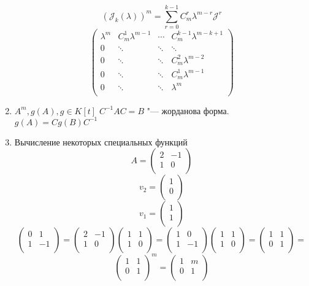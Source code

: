 \begin{enumerate}
$$(\mathcal{J}_k(\lambda))^m = \sum_{r = 0}^{k - 1}C_m^r \lambda^{m - r}\mathcal{J}^r$$
$$
\begin{pmatrix}
\lambda^m& C_m^1 \lambda^{m - 1} &\cdots& C_m^{k - 1}\lambda^{m - k + 1}\\
0&\ddots&\ddots&\ddots\\
0&\ddots&\ddots&C_m^2\lambda^{m - 2}\\
0&\ddots&\ddots&C_m^1\lambda^{m - 1}\\
0&\ddots&\ddots&\lambda^{m}\\
\end{pmatrix}
$$
\item $A^m, g(A), g \in K[t]$
$C^{-1}AC = B$ "--- жорданова форма.
$g(A) = Cg(B)C^{-1}$
\item Вычисление некоторых специальных функций
$$
A = \begin{pmatrix}
2&-1\\
1&0\\
\end{pmatrix}
$$
$$
v_2 = \begin{pmatrix}
1\\
0\\
\end{pmatrix}   
$$
$$
v_1 = \begin{pmatrix}
1\\
1\\
\end{pmatrix} 
$$
$$\begin{pmatrix}
0&1\\
1&-1\\
\end{pmatrix} = 
\begin{pmatrix}
2&-1\\
1&0\\
\end{pmatrix} 
\begin{pmatrix}
1&1\\
1&0\\
\end{pmatrix} = 
\begin{pmatrix}
1&0\\
1&-1\\
\end{pmatrix} \begin{pmatrix}
1&1\\
1&0\\
\end{pmatrix} =
\begin{pmatrix}
1&1\\
0&1\\
\end{pmatrix} =  
$$
$$
\begin{pmatrix}
1&1\\
0&1\\
\end{pmatrix}^m =
\begin{pmatrix}
1&m\\
0&1\\
\end{pmatrix} 
$$


\end{enumerate}

